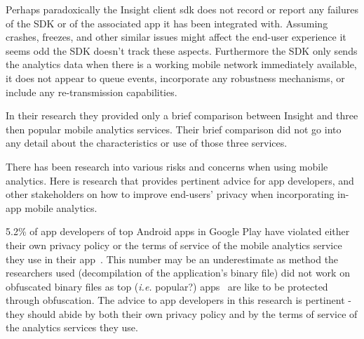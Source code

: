 Perhaps paradoxically the Insight client \Gls{sdk} does not record or report any failures of the SDK or of the associated app it has been integrated with. Assuming crashes, freezes, and other similar issues might affect the end-user experience it seems odd the SDK doesn't track these aspects. Furthermore the SDK only sends the analytics data when there is a working mobile network immediately available, it does not appear to queue events, incorporate any robustness mechanisms, or include any re-transmission capabilities. 

In their research they provided only a brief comparison between Insight and three then popular mobile analytics services. Their brief comparison did not go into any detail about the characteristics or use of those three services.

There has been research into various risks and concerns when using mobile analytics. Here is research that provides pertinent advice for app developers, and other stakeholders on how to improve end-users' privacy when incorporating in-app mobile analytics.

5.2\% of app developers of top Android apps in Google Play have violated either their own privacy policy or the terms of service of the mobile analytics service they use in their app~. This number may be an underestimate as method the researchers used (decompilation of the application's binary file) did not work on obfuscated binary files as top (\emph{i.e.} popular?) apps~ are like to be protected through obfuscation. The advice to app developers in this research is pertinent - they should abide by both their own privacy policy and by the terms of service of the analytics services they use.


